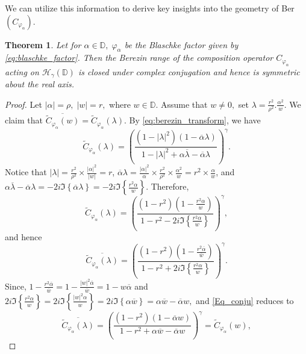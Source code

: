 \documentclass[12pt, reqno]{amsart}
\newtheorem{theorem}{Theorem}[section]
\theoremstyle{definition}
\theoremstyle{remark}
\numberwithin{equation}{section}
\newcommand{\g}{\gamma}
\begin{document}
We can utilize this information to derive key insights into the geometry of Ber$(C_{\varphi_\alpha})$.
\begin{theorem}\label{th:symmetric}
    Let for $\alpha\in \mathbb{D},\;\varphi_\alpha$ be the Blaschke factor given by \eqref{eq:blaschke_factor}. Then the Berezin range of the composition operator $C_{\varphi_\alpha}$ acting on $\mathcal{H}_\gamma(\mathbb{D})$ is closed under complex conjugation and hence is symmetric about the real axis.
\end{theorem}
\begin{proof}
    Let $|\alpha|=\rho,\;|w|=r,$ where $w\in \mathbb{D}$. Assume that $w\neq 0,$ set $\lambda=\frac{r^2}{\rho^2}.\frac{\alpha^2}{w}$. We claim that $\overline{\widetilde{C}_{\varphi_\alpha}(w)}=\widetilde{C}_{\varphi_\alpha}(\lambda)$. By \eqref{eq:berezin_transform}, we have
    \begin{equation*}
        \widetilde{C}_{\varphi_\alpha}(\lambda)=\left(\frac{\left(1-|\lambda|^2\right)\left(1-\overline{\alpha}\lambda\right)}{1-|\lambda|^2+\alpha\overline{\lambda}-\overline{\alpha}\lambda}\right)^\gamma.
    \end{equation*}
Notice that $|\lambda|=\frac{r^2}{\rho^2}\times\frac{|\alpha|^2}{|w|}=r$, $\overline{\alpha}\lambda=\frac{|\alpha|^2}{\alpha}\times\frac{r^2}{\rho^2}\times\frac{\alpha^2}{w}=r^2\times\frac{\alpha}{w}$, and $\alpha\overline{\lambda}-\overline{\alpha}\lambda=-2i \Im\left\{\overline{\alpha}\lambda\right\}=-2i \Im\left\{\frac{r^2\alpha}{w}\right\}$.
   Therefore,
    \begin{equation*}
        \widetilde{C}_{\varphi_\alpha}(\lambda)=\left(\frac{(1-r^2)\left(1-\frac{r^2\alpha}{w}\right)}{1-r^2-2i \Im\left\{\frac{r^2\alpha}{w}\right\}}\right)^\gamma,
    \end{equation*}
and hence
    \begin{equation}\label{Eq_conju}      \overline{\widetilde{C}_{\varphi_\alpha}(\lambda)}=\left(\frac{(1-r^2)\left(1-\frac{r^2\overline{\alpha}}{\overline{w}}\right)}{1-r^2+2i \Im\left\{\frac{r^2\alpha}{w}\right\}}\right)^\g.
    \end{equation}
    Since, $1-\frac{r^2\overline{\alpha}}{\overline{w}}=1-\frac{|w|^2\overline{\alpha}}{\overline{w}}=1-w\overline{\alpha}$ and $2i \Im\left\{\frac{r^2\alpha}{w}\right\}=2i \Im\left\{\frac{|w|^2\alpha}{w}\right\}=2i \Im\left\{\alpha\overline{w}\right\}=\alpha\overline{w}-\overline{\alpha}w,$ and \eqref{Eq_conju} reduces to
    \begin{equation*}
        \overline{\widetilde{C}_{\varphi_\alpha}(\lambda)}=\left(\frac{(1-r^2)\left(1-\overline{\alpha}w\right)}{1-r^2+\alpha\overline{w}-\overline{\alpha}w}\right)^\gamma=\widetilde{C}_{\varphi_\alpha}(w),

\end{equation*}
\end{proof}
\end{document}
